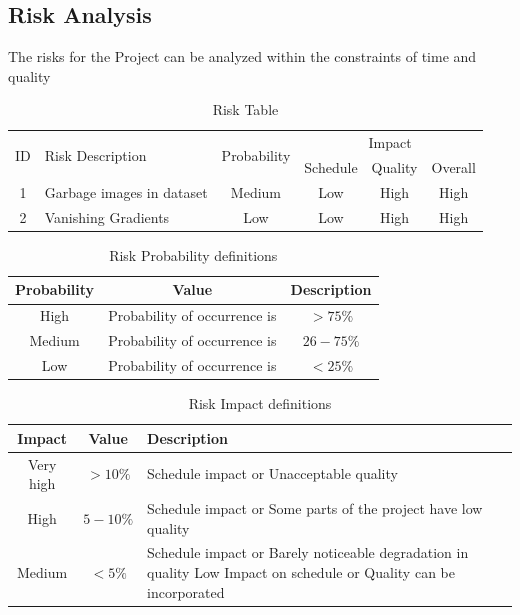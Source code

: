 \documentclass[oneside,a4paper,12pt]{report}
\begin{document}
\subsection{Risk Analysis}
The risks for the Project can be analyzed within the constraints of time and quality

\begin{table}[!htbp]
\begin{center}
\def\arraystretch{1.5}
\begin{tabularx}{\textwidth}{| c | X | c | c | c | c |}
\hline
\multirow{2}{*}{ID} & \multirow{2}{*}{Risk Description}	& \multirow{2}{*}{Probability} & \multicolumn{3}{|c|}{Impact} \\ \cline{4-6}
	& & &	Schedule	& Quality	& Overall \\ \hline
1	& Garbage images in dataset	& Medium	& Low	& High	& High \\ \hline
2	& Vanishing Gradients 	& Low	& Low	& High	& High \\ \hline
\end{tabularx}
\end{center}
\caption{Risk Table}
\label{tab:risk}
\end{table}


\begin{table}[!htbp]
\begin{center}
\def\arraystretch{1.5}
\begin{tabular}{| c | c | c |}
\hline
Probability & Value &	Description \\ \hline
High &	Probability of occurrence is &  $ > 75 \% $ \\ \hline
Medium &	Probability of occurrence is  & $26-75 \% $ \\ \hline
Low	& Probability of occurrence is & $ < 25 \% $ \\ \hline
\end{tabular}
\end{center}
\caption{Risk Probability definitions \citep{bookPressman}}
\label{tab:riskdef}
\end{table}

\begin{table}[!htbp]
\begin{center}
\def\arraystretch{1.5}
\begin{tabularx}{\textwidth}{| c | c | X |}
\hline
Impact & Value	& Description \\ \hline
Very high &	$> 10 \%$ & Schedule impact or Unacceptable quality \\ \hline
High &	$5-10 \%$ & Schedule impact or Some parts of the project have low quality \\ \hline
Medium	& $ < 5 \% $ & Schedule impact or Barely noticeable degradation in quality Low	Impact on schedule or Quality can be incorporated \\ \hline
\end{tabularx}
\end{center}
\caption{Risk Impact definitions \citep{bookPressman}}
\label{tab:riskImpactDef}
\end{table}
\end{document}

